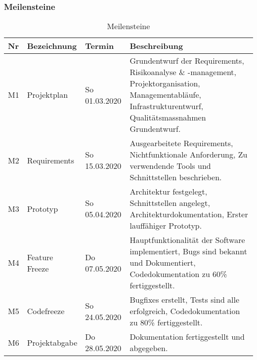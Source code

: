 \documentclass[]{subfiles}
\begin{document}
    \subsubsection{Meilensteine}
    \begin{table}[!h]	
        \begin{tabularx}{\linewidth}{lllX}
            \toprule
            Nr & Bezeichnung & Termin & Beschreibung \\
            \midrule
            M1 & Projektplan & So 01.03.2020 & Grundentwurf der Requirements, Risikoanalyse \& -management, Projektorganisation, Managementabläufe, Infrastrukturentwurf, Qualitätsmassnahmen Grundentwurf.\\
            \midrule
            M2 & Requirements & So 15.03.2020 & Ausgearbeitete Requirements, Nichtfunktionale Anforderung, Zu verwendende Tools und Schnittstellen beschrieben.\\
            \midrule 
            M3 & Prototyp & So 05.04.2020 & Architektur festgelegt, Schnittstellen angelegt, Architekturdokumentation, Erster lauffähiger Prototyp.\\
            \midrule
            M4 & Feature Freeze & Do 07.05.2020 & Hauptfunktionalität der Software implementiert, Bugs sind bekannt und Dokumentiert, Codedokumentation zu 60\% fertiggestellt.\\
            \midrule
            M5 & Codefreeze & So 24.05.2020 & Bugfixes erstellt, Tests sind alle erfolgreich, Codedokumentation zu 80\% fertiggestellt.\\
            \midrule
            M6 & Projektabgabe & Do 28.05.2020 & Dokumentation fertiggestellt und abgegeben.\\
            \bottomrule
        \end{tabularx}
    \caption{Meilensteine}
    \end{table}	
\end{document}
